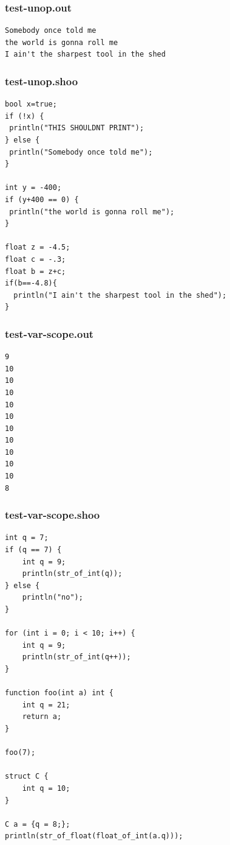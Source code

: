 \documentclass[12pt]{article}
\begin{document}
\subsubsection{test-unop.out}
\begin{mdframed}[hidealllines=true,backgroundcolor=green!10]
\begin{lstlisting}
Somebody once told me
the world is gonna roll me
I ain't the sharpest tool in the shed\end{lstlisting}
\end{mdframed}
\subsubsection{test-unop.shoo}
\begin{mdframed}[hidealllines=true,backgroundcolor=blue!10]
\begin{lstlisting}
bool x=true;
if (!x) {
 println("THIS SHOULDNT PRINT");
} else {
 println("Somebody once told me");
}

int y = -400;
if (y+400 == 0) {
 println("the world is gonna roll me");
}

float z = -4.5;
float c = -.3;
float b = z+c;
if(b==-4.8){
  println("I ain't the sharpest tool in the shed");
}

\end{lstlisting}
\end{mdframed}
\subsubsection{test-var-scope.out}
\begin{mdframed}[hidealllines=true,backgroundcolor=green!10]
\begin{lstlisting}
9
10
10
10
10
10
10
10
10
10
10
8
\end{lstlisting}
\end{mdframed}
\subsubsection{test-var-scope.shoo}
\begin{mdframed}[hidealllines=true,backgroundcolor=blue!10]
\begin{lstlisting}
int q = 7;
if (q == 7) {
    int q = 9;
    println(str_of_int(q));
} else {
    println("no");
}

for (int i = 0; i < 10; i++) {
    int q = 9;
    println(str_of_int(q++));
}

function foo(int a) int {
    int q = 21;
    return a;
}

foo(7);

struct C {
    int q = 10;
}

C a = {q = 8;};
println(str_of_float(float_of_int(a.q)));
\end{lstlisting}
\end{mdframed}
\end{document}
